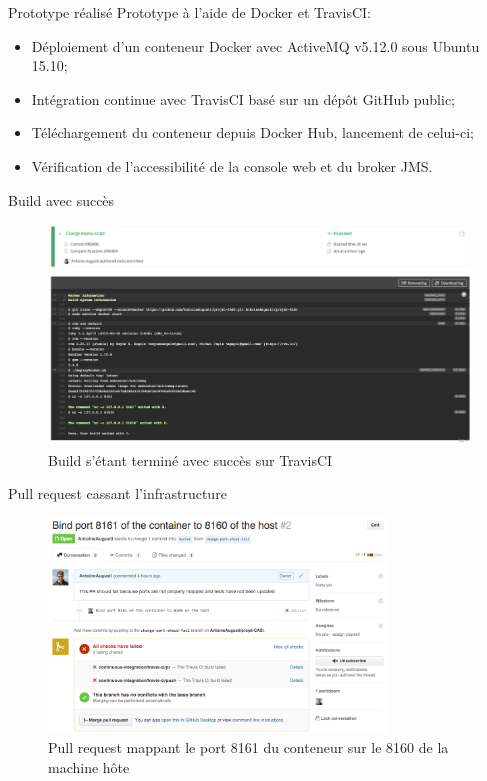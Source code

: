 \begin{frame}{Prototype réalisé}
    Prototype à l'aide de Docker et TravisCI:
    \begin{itemize}
        \item Déploiement d'un conteneur Docker avec ActiveMQ v5.12.0 sous Ubuntu 15.10;
        \item Intégration continue avec TravisCI basé sur un dépôt GitHub public;
        \item Téléchargement du conteneur depuis Docker Hub, lancement de celui-ci;
        \item Vérification de l’accessibilité de la console web et du broker JMS.
    \end{itemize}
\end{frame}

\begin{frame}{Build avec succès}
    \begin{figure}[H]
        \centering
        \includegraphics[width=\textwidth]{images/travis-build-success.png}
        \caption{Build s'étant terminé avec succès sur TravisCI}
    \end{figure}
\end{frame}

\begin{frame}{Pull request cassant l'infrastructure}
    \begin{figure}[H]
        \centering
        \includegraphics[width=0.8\textwidth]{images/pr-build-fail.png}
        \caption{Pull request mappant le port 8161 du conteneur sur le 8160 de la machine hôte}
    \end{figure}
\end{frame}

